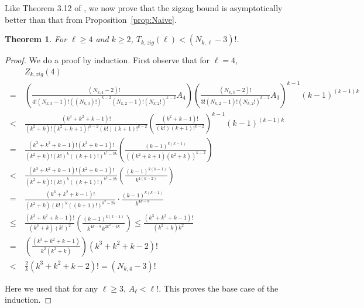 \documentclass[11pt]{article}
\newtheorem{theorem}{Theorem}[section]
\theoremstyle{remark}
\theoremstyle{definition}
\begin{document}
Like Theorem 3.12 of \cite{inagaki2024chipfiringundirectedbinarytrees}, we now prove that the zigzag bound is asymptotically better than that from Proposition~\ref{prop:Naive}.
\begin{theorem}
    For $\ell \geq 4$ and $k \geq 2$, $T_{k, zig}(\ell) < (N_{k, \ell}-3)!$.
\end{theorem}
\begin{proof}
    We do a proof by induction. First observe that for $\ell=4$, 
\begin{align*}
& Z_{k, zig}(4) \\
\ = \ & \left(\frac{(N_{k, 4}-2)!}{4! (N_{k, 3}-1)!((N_{k, 3})!)^{k-2} (N_{k, 2}-1)! (N_{k, 2}!)^{k-2}} A_4\right) \left(\frac{(N_{k, 3}-2)!}{3! (N_{k, 2}-1)! (N_{k, 2}!)^{k-2}} A_3\right)^{k-1}(k-1)^{(k-1)k} \\
\ < \ & \frac{(k^3+k^2+k-1)!}{(k^2+k)!(k^2+k+1)!^{k-2}(k!)(k+1)!^{k-2}} \left(\frac{(k^2+k-1)!}{(k!) (k+1)!^{k-2}}\right)^{k-1} (k-1)^{(k-1)k} \\
\ = \ & \frac{(k^3+k^2+k-1)! (k^2+k-1)!}{(k^2+k)! (k!)^k ((k+1)!)^{k^2-2k}} \left(\frac{(k-1)^{k(k-1)}}{((k^2+k+1)(k^2+k))^{k-2}}\right) \\
\ < \ & \frac{(k^3+k^2+k-1)! (k^2+k-1)!}{(k^2+k)! (k!)^k ((k+1)!)^{k^2-2k}}  \left(\frac{(k-1)^{k(k-1)}}{k^{4(k-2)}}\right) \\ 
\ = \ & \frac{(k^3+k^2+k-1)!}{(k^2+k)(k!)^k((k+1)!)^{k^2-2k}} \cdot \frac{(k-1)^{k(k-1)}}{k^{4k-8}} \\ 
\ \leq \ & \frac{(k^3+k^2+k-1)!}{(k^2+k)(k!)^2} \left(\frac{(k-1)^{k(k-1)}}{k^{4k-8}k^{2k^2-4k}}\right) \leq \frac{(k^3+k^2+k-1)!}{(k^2+k)k^2} \\
\ = \ & \left(\frac{(k^3+k^2+k-1)}{k^2 (k^2+k)}\right) (k^3+k^2+k-2)! \\
\ < \ & \frac{2}{k} (k^3+k^2+k-2)! = (N_{k, 4}-3)!   
\end{align*}

Here we used that for any $\ell \geq 3$, $A_{\ell} < \ell!$. This proves the base case of the induction. 
    

\end{proof}
\end{document}
